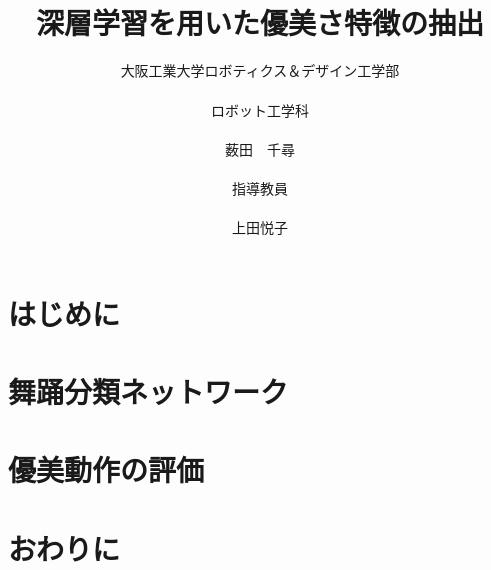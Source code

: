 \documentclass[titlepage,a4pape]{jsarticle}
\title{\vspace{-15mm}{\LARGE 2022年度　卒業論文}\\\vspace{25mm}
\huge
深層学習を用いた優美さ特徴の抽出
\vspace{20mm}\\}
\author{
\Large 大阪工業大学ロボティクス＆デザイン工学部\\\\
\vspace{5mm}\Large ロボット工学科\\
\vspace{5mm}
\vspace{0mm}\\
{\huge 薮田　千尋} \vspace{14.5mm}\\
\\\Large 指導教員\\\\\vspace{-4.0mm}
\vspace{0mm}\Large 上田悦子
}
\date{}
\begin{document}
\maketitle
\newpage


\newpage

\section{はじめに}


\clearpage
\section{舞踊分類ネットワーク}


\clearpage
\section{優美動作の評価}


\section{おわりに}


\clearpage



\end{document}
